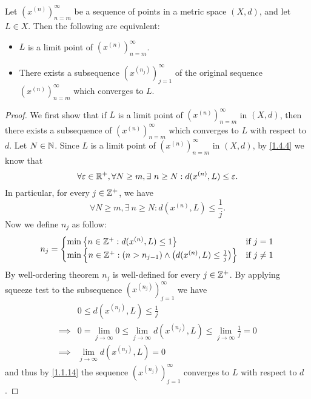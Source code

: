 \begin{prop}\label{1.4.5}
  Let \((x^{(n)})_{n = m}^\infty\) be a sequence of points in a metric space \((X, d)\), and let \(L \in X\).
  Then the following are equivalent:
  \begin{itemize}
    \item \(L\) is a limit point of \((x^{(n)})_{n = m}^\infty\).
    \item There exists a subsequence \((x^{(n_j)})_{j = 1}^\infty\) of the original sequence \((x^{(n)})_{n = m}^\infty\) which converges to \(L\).
  \end{itemize}
\end{prop}

\begin{proof}
  We first show that if \(L\) is a limit point of \((x^{(n)})_{n = m}^\infty\) in \((X, d)\), then there exists a subsequence of \((x^{(n)})_{n = m}^\infty\) which converges to \(L\) with respect to \(d\).
  Let \(N \in \mathbb{N}\).
  Since \(L\) is a limit point of \((x^{(n)})_{n = m}^\infty\) in \((X, d)\), by \cref{1.4.4} we know that
  \[
    \forall \varepsilon \in \mathbb{R}^+, \forall N \geq m, \exists\ n \geq N : d(x^{(n)}, L) \leq \varepsilon.
  \]
  In particular, for every \(j \in \mathbb{Z}^+\), we have
  \[
    \forall N \geq m, \exists\ n \geq N : d(x^{(n)}, L) \leq \frac{1}{j}.
  \]
  Now we define \(n_j\) as follow:
  \[
    n_j = \begin{cases}
      \min\big\{n \in \mathbb{Z}^+ : d(x^{(n)}, L) \leq 1\big\}                                           & \text{if } j = 1    \\
      \min\Big\{n \in \mathbb{Z}^+ : (n > n_{j - 1}) \land \big(d(x^{(n)}, L) \leq \frac{1}{j}\big)\Big\} & \text{if } j \neq 1
    \end{cases}
  \]
  By well-ordering theorem \(n_j\) is well-defined for every \(j \in \mathbb{Z}^+\).
  By applying squeeze test to the subsequence \((x^{(n_j)})_{j = 1}^\infty\) we have
  \begin{align*}
             & 0 \leq d(x^{(n_j)}, L) \leq \frac{1}{j}                                                                     \\
    \implies & 0 = \lim_{j \to \infty} 0 \leq \lim_{j \to \infty} d(x^{(n_j)}, L) \leq \lim_{j \to \infty} \frac{1}{j} = 0 \\
    \implies & \lim_{j \to \infty} d(x^{(n_j)}, L) = 0
  \end{align*}
  and thus by \cref{1.1.14} the sequence \((x^{(n_j)})_{j = 1}^\infty\) converges to \(L\) with respect to \(d\).


\end{proof}
